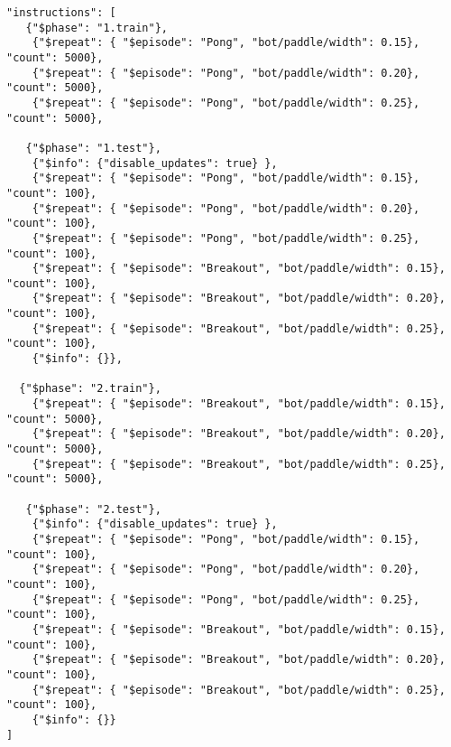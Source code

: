 \begin{small}
\begin{verbatim}
"instructions": [    
   {"$phase": "1.train"}, 
    {"$repeat": { "$episode": "Pong", "bot/paddle/width": 0.15}, "count": 5000}, 
    {"$repeat": { "$episode": "Pong", "bot/paddle/width": 0.20}, "count": 5000},
    {"$repeat": { "$episode": "Pong", "bot/paddle/width": 0.25}, "count": 5000},

   {"$phase": "1.test"},   
    {"$info": {"disable_updates": true} },
    {"$repeat": { "$episode": "Pong", "bot/paddle/width": 0.15}, "count": 100}, 
    {"$repeat": { "$episode": "Pong", "bot/paddle/width": 0.20}, "count": 100},
    {"$repeat": { "$episode": "Pong", "bot/paddle/width": 0.25}, "count": 100},
    {"$repeat": { "$episode": "Breakout", "bot/paddle/width": 0.15}, "count": 100}, 
    {"$repeat": { "$episode": "Breakout", "bot/paddle/width": 0.20}, "count": 100},
    {"$repeat": { "$episode": "Breakout", "bot/paddle/width": 0.25}, "count": 100},
    {"$info": {}},
   
  {"$phase": "2.train"},  
    {"$repeat": { "$episode": "Breakout", "bot/paddle/width": 0.15}, "count": 5000}, 
    {"$repeat": { "$episode": "Breakout", "bot/paddle/width": 0.20}, "count": 5000},
    {"$repeat": { "$episode": "Breakout", "bot/paddle/width": 0.25}, "count": 5000},

   {"$phase": "2.test"},   
    {"$info": {"disable_updates": true} },
    {"$repeat": { "$episode": "Pong", "bot/paddle/width": 0.15}, "count": 100}, 
    {"$repeat": { "$episode": "Pong", "bot/paddle/width": 0.20}, "count": 100},
    {"$repeat": { "$episode": "Pong", "bot/paddle/width": 0.25}, "count": 100},
    {"$repeat": { "$episode": "Breakout", "bot/paddle/width": 0.15}, "count": 100}, 
    {"$repeat": { "$episode": "Breakout", "bot/paddle/width": 0.20}, "count": 100},
    {"$repeat": { "$episode": "Breakout", "bot/paddle/width": 0.25}, "count": 100}, 
    {"$info": {}}
]
\end{verbatim}
\end{small}
